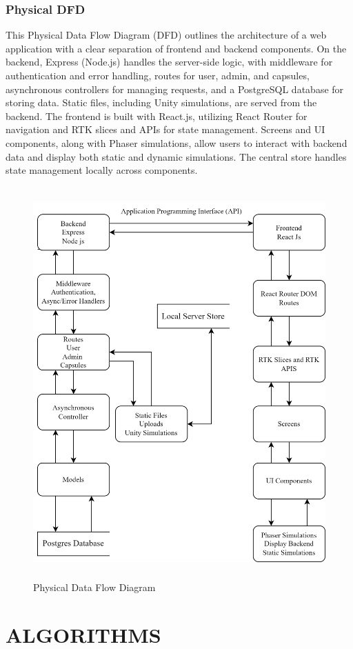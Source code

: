 \subsection{Physical DFD}
This Physical Data Flow Diagram (DFD) outlines the architecture of a web application with a clear separation of frontend and backend components. On the backend, Express (Node.js) handles the server-side logic, with middleware for authentication and error handling, routes for user, admin, and capsules, asynchronous controllers for managing requests, and a PostgreSQL database for storing data. Static files, including Unity simulations, are served from the backend. The frontend is built with React.js, utilizing React Router for navigation and RTK slices and APIs for state management. Screens and UI components, along with Phaser simulations, allow users to interact with backend data and display both static and dynamic simulations. The central store handles state management locally across components.
\begin{figure}[H]
    \centering
    \includegraphics[height = 15cm]{Diagrams/DFD Process Modeling.png}
    \caption{Physical Data Flow Diagram}
\end{figure}
\newpage
\chapter{ALGORITHMS}

